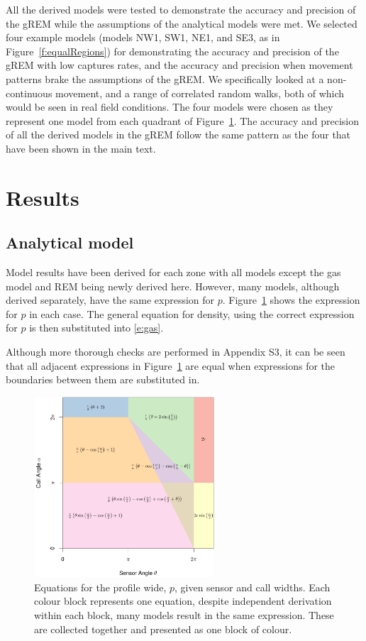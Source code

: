 \documentclass[a4paper,10pt,reqno,oneside]{amsart}
\begin{document}
All the derived models were tested to demonstrate the accuracy and precision of the gREM while the assumptions of the analytical models were met. We selected four example models (models NW1, SW1, NE1, and SE3, as in Figure~\ref{f:equalRegions}) for demonstrating the accuracy and precision of the gREM with low captures rates, and the accuracy and precision when movement patterns brake the assumptions of the gREM.  We specifically looked at a non-continuous movement, and a range of correlated random walks, both of which would be seen in real field conditions. The four models were chosen as they represent one model from each quadrant of Figure~\ref{f:equalModelResults}. The accuracy and precision of all the derived models in the gREM follow the same pattern as the four that have been shown in the main text. 


\section{Results}

\subsection{Analytical model}

Model results have been derived for each zone with all models except the gas model and REM being newly derived here. However, many models, although derived separately, have the same expression for $p$. Figure~\ref{f:equalModelResults} shows the expression for $p$ in each case. The general equation for density, using the correct expression for $p$ is then substituted into \ref{e:gas}.

Although more thorough checks are performed in Appendix S3, it can be seen that all adjacent expressions in Figure~\ref{f:equalModelResults} are equal when expressions for the boundaries between them are substituted in.

\begin{figure}
\centering
\includegraphics[width=0.6\textwidth]{imgs/equalModelResults.pdf}
\caption{Equations for the profile wide, $p$, given sensor and call widths. Each colour block represents one equation, despite independent derivation within each block, many models result in the same expression. These are collected together and presented as one block of colour.}
\label{f:equalModelResults}
\end{figure}
\end{document}
